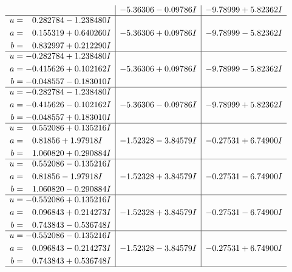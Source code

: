 \documentclass[1p]{elsarticle_modified}
\theoremstyle{definition}
\begin{document}
$$\begin{array}{c|c|c}
 & -5.36306 - 0.09786 I & -9.78999 + 5.82362 I \\ \hline\begin{aligned}
u &= \phantom{-}0.282784 - 1.238480 I \\
a &= \phantom{-}0.155319 + 0.640260 I \\
b &= \phantom{-}0.832997 + 0.212290 I\end{aligned}
 & -5.36306 + 0.09786 I & -9.78999 - 5.82362 I \\ \hline\begin{aligned}
u &= -0.282784 + 1.238480 I \\
a &= -0.415626 + 0.102162 I \\
b &= -0.048557 - 0.183010 I\end{aligned}
 & -5.36306 + 0.09786 I & -9.78999 - 5.82362 I \\ \hline\begin{aligned}
u &= -0.282784 - 1.238480 I \\
a &= -0.415626 - 0.102162 I \\
b &= -0.048557 + 0.183010 I\end{aligned}
 & -5.36306 - 0.09786 I & -9.78999 + 5.82362 I \\ \hline\begin{aligned}
u &= \phantom{-}0.552086 + 0.135216 I \\
a &= \phantom{-}0.81856 + 1.97918 I \\
b &= \phantom{-}1.060820 + 0.290884 I\end{aligned}
 & -1.52328 - 3.84579 I & -0.27531 + 6.74900 I \\ \hline\begin{aligned}
u &= \phantom{-}0.552086 - 0.135216 I \\
a &= \phantom{-}0.81856 - 1.97918 I \\
b &= \phantom{-}1.060820 - 0.290884 I\end{aligned}
 & -1.52328 + 3.84579 I & -0.27531 - 6.74900 I \\ \hline\begin{aligned}
u &= -0.552086 + 0.135216 I \\
a &= \phantom{-}0.096843 + 0.214273 I \\
b &= \phantom{-}0.743843 - 0.536748 I\end{aligned}
 & -1.52328 + 3.84579 I & -0.27531 - 6.74900 I \\ \hline\begin{aligned}
u &= -0.552086 - 0.135216 I \\
a &= \phantom{-}0.096843 - 0.214273 I \\
b &= \phantom{-}0.743843 + 0.536748 I\end{aligned}
 & -1.52328 - 3.84579 I & -0.27531 + 6.74900 I\\
 \hline 
 \end{array}$$\newpage\newpage\renewcommand{\arraystretch}{1}
\end{document}
